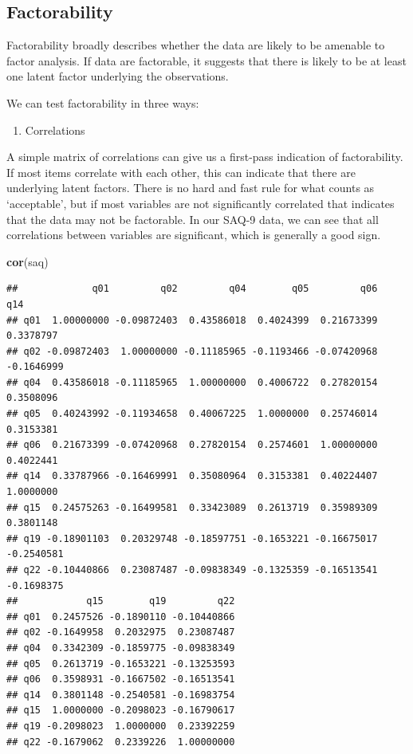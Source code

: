 \documentclass[
]{book}
\newenvironment{Shaded}{\begin{snugshade}}{\end{snugshade}}
\newcommand{\FunctionTok}[1]{\textcolor[rgb]{0.13,0.29,0.53}{\textbf{#1}}}
\newcommand{\NormalTok}[1]{#1}
\providecommand{\tightlist}{%
  \setlength{\itemsep}{0pt}\setlength{\parskip}{0pt}}
\begin{document}
\hypertarget{factorability}{%
\subsection{Factorability}\label{factorability}}

Factorability broadly describes whether the data are likely to be amenable to factor analysis. If data are factorable, it suggests that there is likely to be at least one latent factor underlying the observations.

We can test factorability in three ways:

\begin{enumerate}
\def\labelenumi{\arabic{enumi}.}
\tightlist
\item
  Correlations
\end{enumerate}

A simple matrix of correlations can give us a first-pass indication of factorability. If most items correlate with each other, this can indicate that there are underlying latent factors. There is no hard and fast rule for what counts as `acceptable', but if most variables are not significantly correlated that indicates that the data may not be factorable. In our SAQ-9 data, we can see that all correlations between variables are significant, which is generally a good sign.

\begin{Shaded}
\begin{Highlighting}[]
\FunctionTok{cor}\NormalTok{(saq)}
\end{Highlighting}
\end{Shaded}

\begin{verbatim}
##             q01         q02         q04        q05         q06        q14
## q01  1.00000000 -0.09872403  0.43586018  0.4024399  0.21673399  0.3378797
## q02 -0.09872403  1.00000000 -0.11185965 -0.1193466 -0.07420968 -0.1646999
## q04  0.43586018 -0.11185965  1.00000000  0.4006722  0.27820154  0.3508096
## q05  0.40243992 -0.11934658  0.40067225  1.0000000  0.25746014  0.3153381
## q06  0.21673399 -0.07420968  0.27820154  0.2574601  1.00000000  0.4022441
## q14  0.33787966 -0.16469991  0.35080964  0.3153381  0.40224407  1.0000000
## q15  0.24575263 -0.16499581  0.33423089  0.2613719  0.35989309  0.3801148
## q19 -0.18901103  0.20329748 -0.18597751 -0.1653221 -0.16675017 -0.2540581
## q22 -0.10440866  0.23087487 -0.09838349 -0.1325359 -0.16513541 -0.1698375
##            q15        q19         q22
## q01  0.2457526 -0.1890110 -0.10440866
## q02 -0.1649958  0.2032975  0.23087487
## q04  0.3342309 -0.1859775 -0.09838349
## q05  0.2613719 -0.1653221 -0.13253593
## q06  0.3598931 -0.1667502 -0.16513541
## q14  0.3801148 -0.2540581 -0.16983754
## q15  1.0000000 -0.2098023 -0.16790617
## q19 -0.2098023  1.0000000  0.23392259
## q22 -0.1679062  0.2339226  1.00000000
\end{verbatim}
\end{document}

